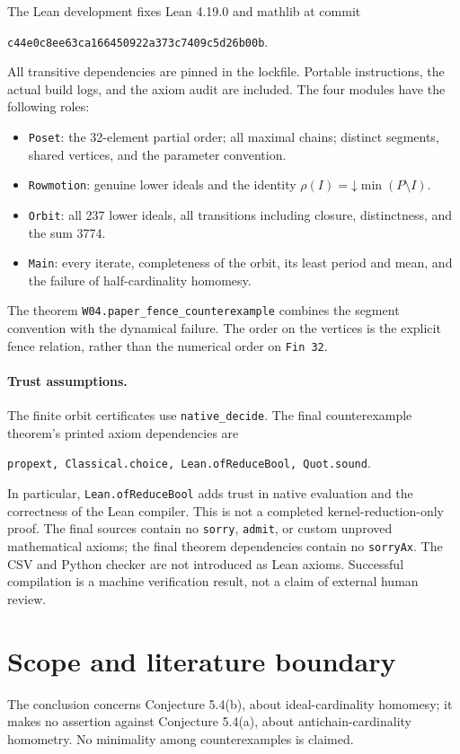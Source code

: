 \documentclass[11pt]{article}
\begin{document}
The Lean development fixes Lean 4.19.0 and mathlib at commit
\begin{center}
\small\texttt{c44e0c8ee63ca166450922a373c7409c5d26b00b}.
\end{center}
All transitive dependencies are pinned in the lockfile. Portable instructions, the
actual build logs, and the axiom audit are included. The four modules
have the following roles:
\begin{itemize}
\item \texttt{Poset}: the 32-element partial order; all maximal chains;
      distinct segments, shared vertices, and the parameter convention.
\item \texttt{Rowmotion}: genuine lower ideals and the identity
      $\rho(I)=\mathord\downarrow\min(P\setminus I)$.
\item \texttt{Orbit}: all 237 lower ideals, all transitions including
      closure, distinctness, and the sum 3774.
\item \texttt{Main}: every iterate, completeness of the orbit, its
      least period and mean, and the failure of half-cardinality homomesy.
\end{itemize}
The theorem \texttt{W04.paper\_fence\_counterexample} combines the
segment convention with the dynamical failure. The order on the vertices
is the explicit fence relation, rather than the numerical order on
\texttt{Fin 32}.

\paragraph{Trust assumptions.}
The finite orbit certificates use \texttt{native\_decide}.
The final counterexample theorem's printed axiom dependencies are
\begin{center}
\texttt{propext, Classical.choice, Lean.ofReduceBool, Quot.sound}.
\end{center}
In particular, \texttt{Lean.ofReduceBool} adds trust in native evaluation
and the correctness of the Lean compiler. This is not a completed
kernel-reduction-only proof. The final sources contain no
\texttt{sorry}, \texttt{admit}, or custom unproved mathematical axioms;
the final theorem dependencies contain no \texttt{sorryAx}. The CSV and
Python checker are not introduced as Lean axioms. Successful compilation
is a machine verification result, not a claim of external human review.

\section{Scope and literature boundary}
The conclusion concerns Conjecture 5.4(b), about ideal-cardinality
homomesy; it makes no assertion against Conjecture 5.4(a), about
antichain-cardinality homometry. No minimality among counterexamples is
claimed.
\end{document}
